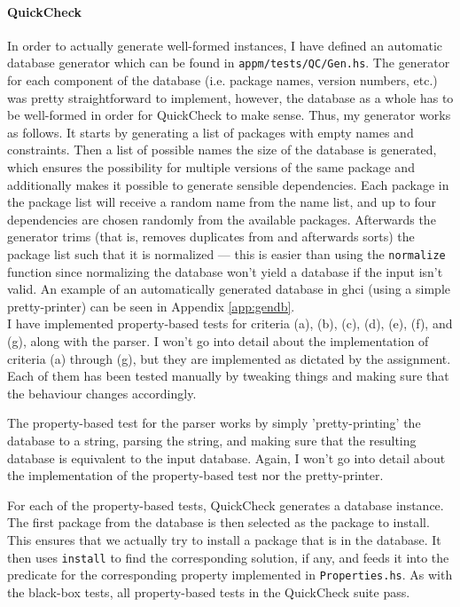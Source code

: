 \paragraph{QuickCheck}
In order to actually generate well-formed instances, I have defined an automatic database generator which can be found in \texttt{appm/tests/QC/Gen.hs}. The generator for each component of the database (i.e. package names, version numbers, etc.) was pretty straightforward to implement, however, the database as a whole has to be well-formed in order for QuickCheck to make sense. Thus, my generator works as follows. It starts by generating a list of packages with empty names and constraints. Then a list of possible names the size of the database is generated, which ensures the possibility for multiple versions of the same package and additionally makes it possible to generate sensible dependencies. Each package in the package list will receive a random name from the name list, and up to four dependencies are chosen randomly from the available packages. Afterwards the generator trims (that is, removes duplicates from and afterwards sorts) the package list such that it is normalized --- this is easier than using the \texttt{normalize} function since normalizing the database won't yield a database if the input isn't valid. An example of an automatically generated database in ghci (using a simple pretty-printer) can be seen in Appendix \ref{app:gendb}. \\

\noindent I have implemented property-based tests for criteria (a), (b), (c), (d), (e), (f), and (g), along with the parser. I won't go into detail about the implementation of criteria (a) through (g), but they are implemented as dictated by the assignment. Each of them has been tested manually by tweaking things and making sure that the behaviour changes accordingly.

The property-based test for the parser works by simply 'pretty-printing' the database to a string, parsing the string, and making sure that the resulting database is equivalent to the input database. Again, I won't go into detail about the implementation of the property-based test nor the pretty-printer.

For each of the property-based tests, QuickCheck generates a database instance. The first package from the database is then selected as the package to install. This ensures that we actually try to install a package that is in the database. It then uses \texttt{install} to find the corresponding solution, if any, and feeds it into the predicate for the corresponding property implemented in \texttt{Properties.hs}. As with the black-box tests, all property-based tests in the QuickCheck suite pass.


